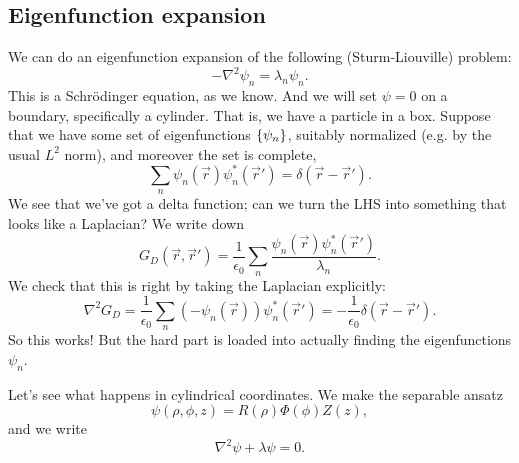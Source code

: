 \subsection*{Eigenfunction expansion}
We can do an eigenfunction expansion of the following (Sturm-Liouville) problem:
\begin{equation}
    -\nabla^2 \psi_n = \lambda_n \psi_n.
\end{equation}
This is a Schr\"odinger equation, as we know. And we will set $\psi=0$ on a boundary, specifically a cylinder. That is, we have a particle in a box. Suppose that we have some set of eigenfunctions $\{\psi_n\}$, suitably normalized (e.g. by the usual $L^2$ norm), and moreover the set is complete,
\begin{equation}
    \sum_n \psi_n(\vec r) \psi_n^*(\vec r') = \delta(\vec r- \vec r').
\end{equation}
We see that we've got a delta function; can we turn the LHS into something that looks like a Laplacian? We write down
\begin{equation}
    G_D(\vec r, \vec r') = \frac{1}{\epsilon_0} \sum_n \frac{\psi_n(\vec r) \psi_n^*(\vec r')}{\lambda_n}.
\end{equation}
We check that this is right by taking the Laplacian explicitly:
\begin{equation}
    \nabla^2 G_D = \frac{1}{\epsilon_0} \sum_n (-\psi_n(\vec r)) \psi^*_n(\vec r') = -\frac{1}{\epsilon_0} \delta(\vec r-\vec r').
\end{equation}
So this works! But the hard part is loaded into actually finding the eigenfunctions $\psi_n$.

Let's see what happens in cylindrical coordinates. We make the separable ansatz
\begin{equation}
    \psi(\rho,\phi,z) = R(\rho) \Phi(\phi) Z(z),
\end{equation}
and we write
\begin{equation}
    \nabla^2 \psi + \lambda \psi = 0.
\end{equation}

